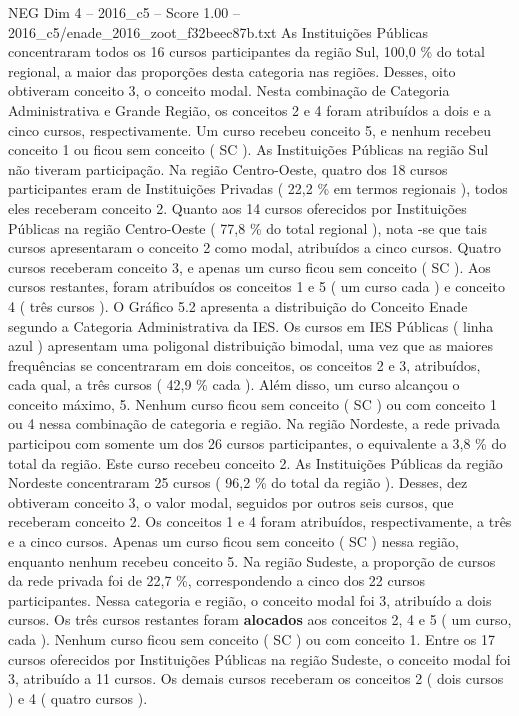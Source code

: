 \begin{textsample}{NEG Dim 4 – 2016\_c5 – Score 1.00 – 2016\_c5/enade\_2016\_zoot\_f32beec87b.txt}
As Instituições Públicas concentraram todos os 16 cursos participantes da região Sul, 100,0 \% do total regional, a maior das proporções desta categoria nas regiões.
Desses, oito obtiveram conceito 3, o conceito modal.
Nesta combinação de Categoria Administrativa e Grande Região, os conceitos 2 e 4 foram atribuídos a dois e a cinco cursos, respectivamente.
Um curso recebeu conceito 5, e nenhum recebeu conceito 1 ou ficou sem conceito ( SC ).
As Instituições Públicas na região Sul não tiveram participação.
Na região Centro-Oeste, quatro dos 18 cursos participantes eram de Instituições Privadas ( 22,2 \% em termos regionais ), todos eles receberam conceito 2.
Quanto aos 14 cursos oferecidos por Instituições Públicas na região Centro-Oeste ( 77,8 \% do total regional ), nota -se que tais cursos apresentaram o conceito 2 como modal, atribuídos a cinco cursos.
Quatro cursos receberam conceito 3, e apenas um curso ficou sem conceito ( SC ).
Aos cursos restantes, foram atribuídos os conceitos 1 e 5 ( um curso cada ) e conceito 4 ( três cursos ).
O Gráfico 5.2 apresenta a distribuição do Conceito Enade segundo a Categoria Administrativa da IES.
Os cursos em IES Públicas ( linha azul ) apresentam uma poligonal distribuição bimodal, uma vez que as maiores frequências se concentraram em dois conceitos, os conceitos 2 e 3, atribuídos, cada qual, a três cursos ( 42,9 \% cada ).
Além disso, um curso alcançou o conceito máximo, 5.
Nenhum curso ficou sem conceito ( SC ) ou com conceito 1 ou 4 nessa combinação de categoria e região.
Na região Nordeste, a rede privada participou com somente um dos 26 cursos participantes, o equivalente a 3,8 \% do total da região.
Este curso recebeu conceito 2.
As Instituições Públicas da região Nordeste concentraram 25 cursos ( 96,2 \% do total da região ).
Desses, dez obtiveram conceito 3, o valor modal, seguidos por outros seis cursos, que receberam conceito 2.
Os conceitos 1 e 4 foram atribuídos, respectivamente, a três e a cinco cursos.
Apenas um curso ficou sem conceito ( SC ) nessa região, enquanto nenhum recebeu conceito 5.
Na região Sudeste, a proporção de cursos da rede privada foi de 22,7 \%, correspondendo a cinco dos 22 cursos participantes.
Nessa categoria e região, o conceito modal foi 3, atribuído a dois cursos.
Os três cursos restantes foram \textbf{alocados} aos conceitos 2, 4 e 5 ( um curso, cada ).
Nenhum curso ficou sem conceito ( SC ) ou com conceito 1.
Entre os 17 cursos oferecidos por Instituições Públicas na região Sudeste, o conceito modal foi 3, atribuído a 11 cursos.
Os demais cursos receberam os conceitos 2 ( dois cursos ) e 4 ( quatro cursos ).

\end{textsample}
